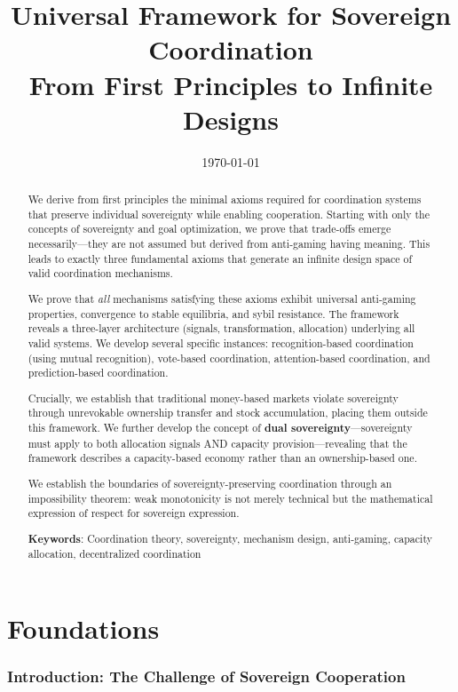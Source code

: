 \documentclass[11pt,a4paper]{article}
\title{\textbf{Universal Framework for Sovereign Coordination}\\
\large From First Principles to Infinite Designs}
\author{}
\date{\today}
\theoremstyle{definition}
\theoremstyle{remark}
\begin{document}
\maketitle

\begin{abstract}
We derive from first principles the minimal axioms required for coordination systems that preserve individual sovereignty while enabling cooperation. Starting with only the concepts of sovereignty and goal optimization, we prove that trade-offs emerge necessarily—they are not assumed but derived from anti-gaming having meaning. This leads to exactly three fundamental axioms that generate an infinite design space of valid coordination mechanisms. 

We prove that \textit{all} mechanisms satisfying these axioms exhibit universal anti-gaming properties, convergence to stable equilibria, and sybil resistance. The framework reveals a three-layer architecture (signals, transformation, allocation) underlying all valid systems. We develop several specific instances: recognition-based coordination (using mutual recognition), vote-based coordination, attention-based coordination, and prediction-based coordination.

Crucially, we establish that traditional money-based markets violate sovereignty through unrevokable ownership transfer and stock accumulation, placing them outside this framework. We further develop the concept of \textbf{dual sovereignty}—sovereignty must apply to both allocation signals AND capacity provision—revealing that the framework describes a capacity-based economy rather than an ownership-based one. 

We establish the boundaries of sovereignty-preserving coordination through an impossibility theorem: weak monotonicity is not merely technical but the mathematical expression of respect for sovereign expression.

\medskip

\noindent\textbf{Keywords}: Coordination theory, sovereignty, mechanism design, anti-gaming, capacity allocation, decentralized coordination
\end{abstract}

\tableofcontents
\newpage

\part{Foundations}

\section{Introduction: The Challenge of Sovereign Cooperation}
\end{document}
